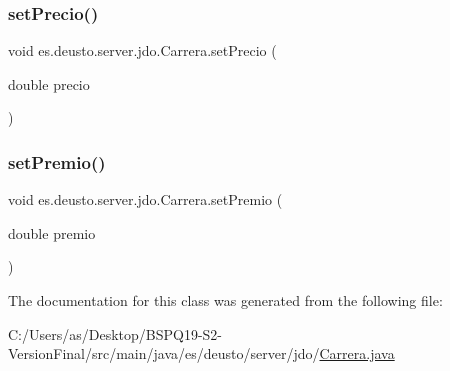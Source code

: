 \mbox{\label{classes_1_1deusto_1_1server_1_1jdo_1_1_carrera_ad573b2a0fbfe4889940497e81f5840aa}} 
\subsubsection{\texorpdfstring{setPrecio()}{setPrecio()}}
{\footnotesize\ttfamily void es.\+deusto.\+server.\+jdo.\+Carrera.\+set\+Precio (\begin{DoxyParamCaption}\item[{double}]{precio }\end{DoxyParamCaption})}

\mbox{\label{classes_1_1deusto_1_1server_1_1jdo_1_1_carrera_a815210f549d1d724250882806f9b62c4}} 
\subsubsection{\texorpdfstring{setPremio()}{setPremio()}}
{\footnotesize\ttfamily void es.\+deusto.\+server.\+jdo.\+Carrera.\+set\+Premio (\begin{DoxyParamCaption}\item[{double}]{premio }\end{DoxyParamCaption})}



The documentation for this class was generated from the following file\+:\begin{DoxyCompactItemize}
\item 
C\+:/\+Users/as/\+Desktop/\+B\+S\+P\+Q19-\/\+S2-\/\+Version\+Final/src/main/java/es/deusto/server/jdo/\mbox{\hyperlink{_carrera_8java}{Carrera.\+java}}\end{DoxyCompactItemize}
